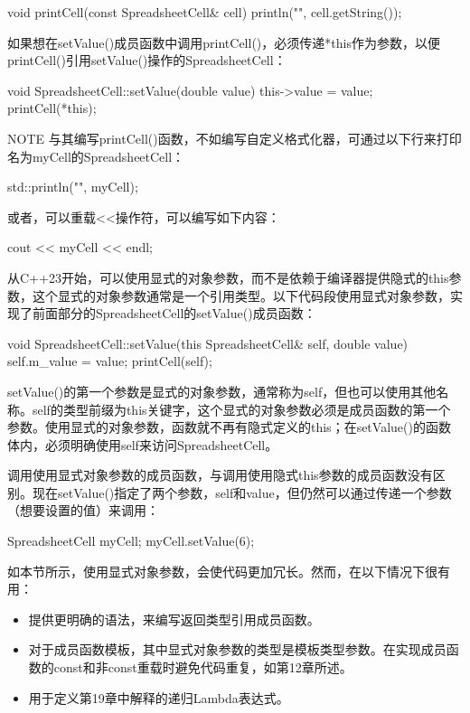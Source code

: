 \begin{cpp}
void printCell(const SpreadsheetCell& cell)
{
    println("{}", cell.getString());
}
\end{cpp}

如果想在setValue()成员函数中调用printCell()，必须传递*this作为参数，以便printCell()引用setValue()操作的SpreadsheetCell：

\begin{cpp}
void SpreadsheetCell::setValue(double value)
{
    this->value = value;
    printCell(*this);
}
\end{cpp}

\begin{myNotic}{NOTE}
与其编写printCell()函数，不如编写自定义格式化器，可通过以下行来打印名为myCell的SpreadsheetCell：

\begin{cpp}
std::println("{}", myCell);
\end{cpp}

或者，可以重载<{}<操作符，可以编写如下内容：

\begin{cpp}
cout << myCell << endl;
\end{cpp}
\end{myNotic}



从C++23开始，可以使用显式的对象参数，而不是依赖于编译器提供隐式的this参数，这个显式的对象参数通常是一个引用类型。以下代码段使用显式对象参数，实现了前面部分的SpreadsheetCell的setValue()成员函数：

\begin{cpp}
void SpreadsheetCell::setValue(this SpreadsheetCell& self, double value)
{
    self.m_value = value;
    printCell(self);
}
\end{cpp}

setValue()的第一个参数是显式的对象参数，通常称为self，但也可以使用其他名称。self的类型前缀为this关键字，这个显式的对象参数必须是成员函数的第一个参数。使用显式的对象参数，函数就不再有隐式定义的this；在setValue()的函数体内，必须明确使用self来访问SpreadsheetCell。

调用使用显式对象参数的成员函数，与调用使用隐式this参数的成员函数没有区别。现在setValue()指定了两个参数，self和value，但仍然可以通过传递一个参数（想要设置的值）来调用：

\begin{cpp}
SpreadsheetCell myCell;
myCell.setValue(6);
\end{cpp}

如本节所示，使用显式对象参数，会使代码更加冗长。然而，在以下情况下很有用：

\begin{itemize}
\item
提供更明确的语法，来编写返回类型引用成员函数。

\item
对于成员函数模板，其中显式对象参数的类型是模板类型参数。在实现成员函数的const和非const重载时避免代码重复，如第12章所述。

\item
用于定义第19章中解释的递归Lambda表达式。
\end{itemize}










